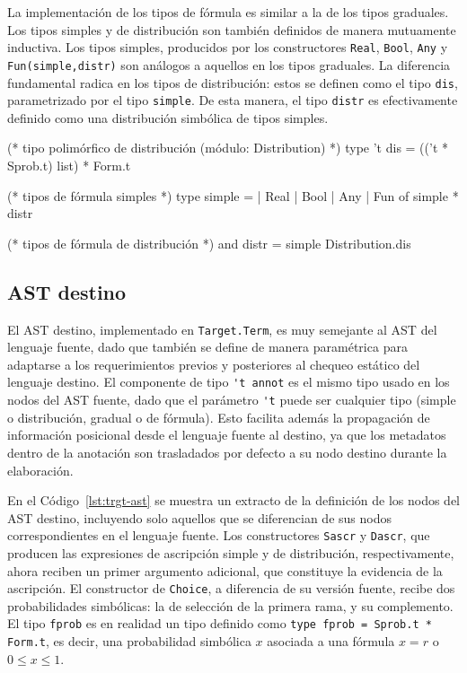 La implementación de los tipos de fórmula es similar a la de los tipos
graduales. Los tipos simples y de distribución son también definidos de manera
mutuamente inductiva. Los tipos simples, producidos por los constructores
\verb|Real|, \verb|Bool|, \verb|Any| y \verb|Fun(simple,distr)| son análogos a
aquellos en los tipos graduales. La diferencia fundamental radica en los tipos de
distribución: estos se definen como el tipo \verb|dis|, parametrizado por el
tipo \verb|simple|. De esta manera, el tipo \verb|distr| es efectivamente
definido como una distribución simbólica de tipos simples. 

\begin{ocamlblock}[caption={Distribución Paramétrica y Tipos de Fórmula}, label={lst:ftype}]
  (* tipo polimórfico de distribución (módulo: Distribution) *)
  type 't dis = (('t * Sprob.t) list) * Form.t

  (* tipos de fórmula simples *)
  type simple = 
  | Real
  | Bool
  | Any 
  | Fun of simple * distr

  (* tipos de fórmula de distribución *)
  and distr = simple Distribution.dis
\end{ocamlblock}


\subsection{AST destino}
El AST destino, implementado en \verb|Target.Term|, es muy semejante al AST del
lenguaje fuente, dado que también se define de manera paramétrica para
adaptarse a los requerimientos previos y posteriores al chequeo estático del
lenguaje destino. El componente de tipo \verb|'t annot| es el mismo tipo usado
en los nodos del AST fuente, dado que el parámetro \verb|'t| puede ser
cualquier tipo (simple o distribución, gradual o de fórmula). Esto facilita
además la propagación de información posicional desde el lenguaje fuente al
destino, ya que los metadatos dentro de la anotación son trasladados por defecto
a su nodo destino durante la elaboración.

En el Código~\ref{lst:trgt-ast} se muestra un extracto de la
definición de los nodos del AST destino, incluyendo solo aquellos
que se diferencian de sus nodos correspondientes en el lenguaje
fuente.  Los constructores \verb|Sascr| y \verb|Dascr|, que producen
las expresiones de ascripción simple y de distribución,
respectivamente, ahora reciben un primer argumento adicional, que
constituye la evidencia de la ascripción. El constructor de
\verb|Choice|, a diferencia de su versión fuente, recibe dos
probabilidades simbólicas: la de selección de la primera rama, y su
complemento. El tipo \verb|fprob| es en realidad un tipo definido
como \verb|type fprob = Sprob.t * Form.t|, es decir, una probabilidad
simbólica $x$ asociada a una fórmula $x=r$ o $0\leq x \leq 1$.



